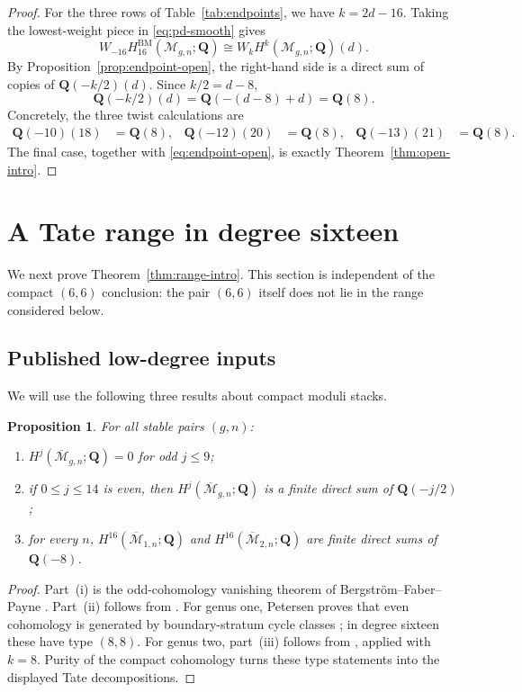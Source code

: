 \documentclass[12pt,reqno]{amsart}
\newcommand{\Q}{\mathbf{Q}}
\newcommand{\M}{\mathcal{M}}
\newcommand{\Mbar}{\overline{\mathcal{M}}}
\newcommand{\BM}{\mathrm{BM}}
\newtheorem{proposition}[theorem]{Proposition}
\theoremstyle{definition}
\theoremstyle{remark}
\begin{document}
\begin{proof}
For the three rows of Table~\ref{tab:endpoints}, we have $k=2d-16$.
Taking the lowest-weight piece in \eqref{eq:pd-smooth} gives
\[
 W_{-16}H_{16}^{\BM}(\M_{g,n};\Q)
 \cong W_kH^k(\M_{g,n};\Q)(d).
\]
By Proposition~\ref{prop:endpoint-open}, the right-hand side is a direct sum
of copies of $\Q(-k/2)(d)$.  Since $k/2=d-8$,
\[
  \Q(-k/2)(d)=\Q(-(d-8)+d)=\Q(8).
\]
Concretely, the three twist calculations are
\begin{align*}
 \Q(-10)(18)&=\Q(8),&
 \Q(-12)(20)&=\Q(8),&
 \Q(-13)(21)&=\Q(8).
\end{align*}
The final case, together with \eqref{eq:endpoint-open}, is exactly
Theorem~\ref{thm:open-intro}.
\end{proof}

\section{A Tate range in degree sixteen}

We next prove Theorem~\ref{thm:range-intro}.  This section is independent of
the compact $(6,6)$ conclusion: the pair $(6,6)$ itself does not lie in the
range considered below.

\subsection{Published low-degree inputs}

We will use the following three results about compact moduli stacks.

\begin{proposition}\label{prop:low-degree-inputs}
For all stable pairs $(g,n)$:
\begin{enumerate}[label=\textup{(\roman*)}]
\item $H^j(\Mbar_{g,n};\Q)=0$ for odd $j\leq9$;
\item if $0\leq j\leq14$ is even, then
  $H^j(\Mbar_{g,n};\Q)$ is a finite direct sum of $\Q(-j/2)$;
\item for every $n$, $H^{16}(\Mbar_{1,n};\Q)$ and
  $H^{16}(\Mbar_{2,n};\Q)$ are finite direct sums of $\Q(-8)$.
\end{enumerate}
\end{proposition}

\begin{proof}
Part~(i) is the odd-cohomology vanishing theorem of
Bergstr\"om--Faber--Payne \cite[Theorem~1.1]{BFP}.  Part~(ii) follows from
\cite[Theorem~1.5(3) and the discussion following it]{CLP}.  For genus one,
Petersen proves that even cohomology is generated by boundary-stratum cycle
classes \cite[Theorem~1.1]{PetersenGenusOne}; in degree sixteen these have
type $(8,8)$.  For genus two, part~(iii) follows from
\cite[Corollary~2.7]{CLP}, applied with $k=8$.  Purity of the compact
cohomology turns these type statements into the displayed Tate
decompositions.
\end{proof}
\end{document}
